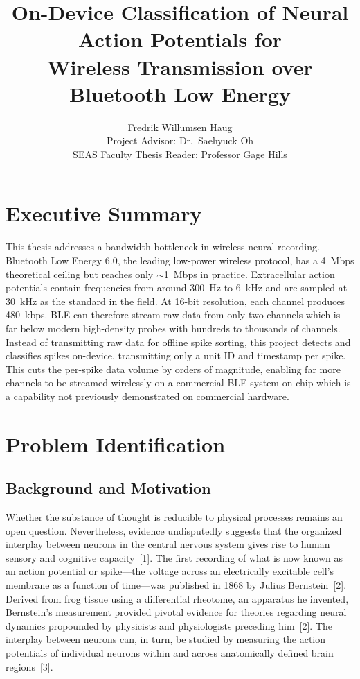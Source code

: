 \documentclass[11pt]{article}
\title{On-Device Classification of Neural Action Potentials for\\
Wireless Transmission over Bluetooth Low Energy}
\author{Fredrik Willumsen Haug \\[0.6em]
{\normalsize Project Advisor: Dr.\ Saehyuck Oh} \\[0.2em]
{\normalsize SEAS Faculty Thesis Reader: Professor Gage Hills}}
\date{}
\begin{document}
\maketitle

\tableofcontents
\bigskip

\setcounter{section}{-1}
\section{Executive Summary}
This thesis addresses a bandwidth bottleneck in wireless neural recording. Bluetooth Low
Energy 6.0, the leading low-power wireless protocol, has a 4~Mbps theoretical ceiling
but reaches only $\sim$1~Mbps in practice. Extracellular action potentials contain
frequencies from around 300~Hz to 6~kHz and are sampled at 30~kHz as the standard in the
field. At 16-bit resolution, each channel produces 480~kbps. BLE can therefore stream raw
data from only two channels which is far below modern high-density probes with hundreds to
thousands of channels. Instead of transmitting raw data for offline spike sorting, this
project detects and classifies spikes on-device, transmitting only a unit ID and timestamp
per spike. This cuts the per-spike data volume by orders of magnitude, enabling far more
channels to be streamed wirelessly on a commercial BLE system-on-chip which is a capability
not previously demonstrated on commercial hardware.

\section{Problem Identification}

\subsection{Background and Motivation}
Whether the substance of thought is reducible to physical processes remains an open
question. Nevertheless, evidence undisputedly suggests that the organized interplay between
neurons in the central nervous system gives rise to human sensory and cognitive
capacity~[1]. The first recording of what is now known as an action potential or
spike---the voltage across an electrically excitable cell's membrane as a function of
time---was published in 1868 by Julius Bernstein~[2]. Derived from frog tissue using a
differential rheotome, an apparatus he invented, Bernstein's measurement provided pivotal
evidence for theories regarding neural dynamics propounded by physicists and physiologists
preceding him~[2]. The interplay between neurons can, in turn, be studied by measuring the
action potentials of individual neurons within and across anatomically defined brain
regions~[3].
\end{document}
